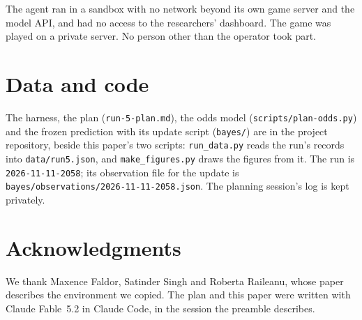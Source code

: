 \documentclass[11pt,a4paper]{article}
\begin{document}
The agent ran in a sandbox with no network beyond its own game server and the model API, and had no access to the researchers' dashboard. The game was played on a private server. No person other than the operator took part.

\section{Data and code}

The harness, the plan (\texttt{run-5-plan.md}), the odds model (\texttt{scripts/plan-odds.py}) and the frozen prediction with its update script (\texttt{bayes/}) are in the project repository, beside this paper's two scripts: \texttt{run\_data.py} reads the run's records into \texttt{data/run5.json}, and \texttt{make\_figures.py} draws the figures from it. The run is \texttt{2026-11-11-2058}; its observation file for the update is \nolinkurl{bayes/observations/2026-11-11-2058.json}. The planning session's log is kept privately.

\section*{Acknowledgments}

We thank Maxence Faldor, Satinder Singh and Roberta Raileanu, whose paper describes the environment we copied. The plan and this paper were written with Claude Fable~5.2 in Claude Code, in the session the preamble describes.



\end{document}
